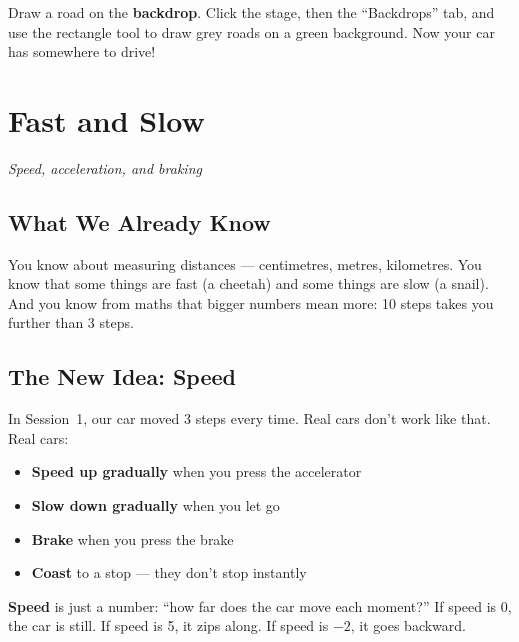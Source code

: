 \documentclass[11pt,a4paper]{article}
\begin{document}
\begin{stretchbox}
Draw a road on the \textbf{backdrop}. Click the stage, then the ``Backdrops'' tab, and use the rectangle tool to draw grey roads on a green background. Now your car has somewhere to drive!
\end{stretchbox}

\newpage

\section{Fast and Slow}
\textit{\large Speed, acceleration, and braking}

\subsection{What We Already Know}

You know about measuring distances --- centimetres, metres, kilometres. You know that some things are fast (a cheetah) and some things are slow (a snail). And you know from maths that bigger numbers mean more: 10 steps takes you further than 3 steps.

\subsection{The New Idea: Speed}

In Session~1, our car moved 3 steps every time. Real cars don't work like that. Real cars:

\begin{itemize}[nosep]
  \item \textbf{Speed up gradually} when you press the accelerator
  \item \textbf{Slow down gradually} when you let go
  \item \textbf{Brake} when you press the brake
  \item \textbf{Coast} to a stop --- they don't stop instantly
\end{itemize}

\textbf{Speed} is just a number: ``how far does the car move each moment?'' If speed is 0, the car is still. If speed is 5, it zips along. If speed is $-2$, it goes backward.
\end{document}
